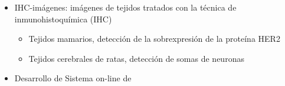 \frame
{
\frametitle{}
        \begin{columns}
	    \begin{itemize}
        	\item IHC-imágenes: imágenes de tejidos tratados con la técnica de inmunohistoquímica (IHC) 
	        \begin{itemize}
               	\item Tejidos mamarios, detección de la sobrexpresión de la proteína HER2
              	\item Tejidos cerebrales de ratas, detección de somas de neuronas
             \end{itemize}
	        \item Desarrollo de Sistema on-line de

	    \end{itemize}


\\

        \end{columns}
}


%
